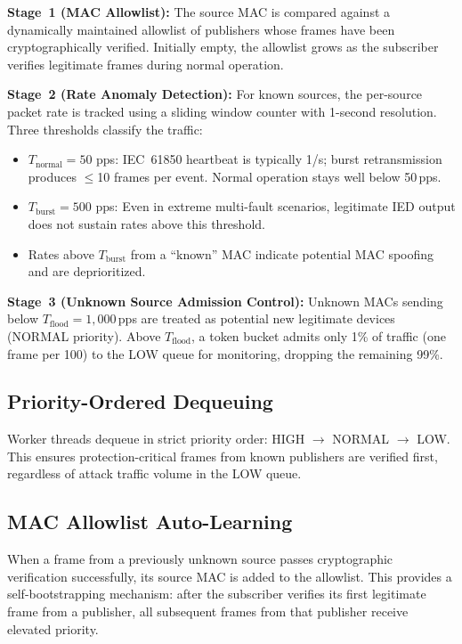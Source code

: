 \documentclass{ieeeaccess}
\begin{document}
\textbf{Stage~1 (MAC Allowlist):} The source MAC is compared against a dynamically maintained allowlist of publishers whose frames have been cryptographically verified. Initially empty, the allowlist grows as the subscriber verifies legitimate frames during normal operation.

\textbf{Stage~2 (Rate Anomaly Detection):} For known sources, the per-source packet rate is tracked using a sliding window counter with 1-second resolution. Three thresholds classify the traffic:
\begin{itemize}[leftmargin=*]
    \item $T_{\text{normal}} = 50$ pps: IEC~61850 heartbeat is typically 1/s; burst retransmission produces $\leq$10 frames per event. Normal operation stays well below 50\,pps.
    \item $T_{\text{burst}} = 500$ pps: Even in extreme multi-fault scenarios, legitimate IED output does not sustain rates above this threshold.
    \item Rates above $T_{\text{burst}}$ from a ``known'' MAC indicate potential MAC spoofing and are deprioritized.
\end{itemize}

\textbf{Stage~3 (Unknown Source Admission Control):} Unknown MACs sending below $T_{\text{flood}} = 1{,}000$\,pps are treated as potential new legitimate devices (NORMAL priority). Above $T_{\text{flood}}$, a token bucket admits only 1\% of traffic (one frame per 100) to the LOW queue for monitoring, dropping the remaining 99\%.

\subsection{Priority-Ordered Dequeuing}
Worker threads dequeue in strict priority order: HIGH $\rightarrow$ NORMAL $\rightarrow$ LOW. This ensures protection-critical frames from known publishers are verified first, regardless of attack traffic volume in the LOW queue.

\subsection{MAC Allowlist Auto-Learning}
When a frame from a previously unknown source passes cryptographic verification successfully, its source MAC is added to the allowlist. This provides a self-bootstrapping mechanism: after the subscriber verifies its first legitimate frame from a publisher, all subsequent frames from that publisher receive elevated priority.
\end{document}
